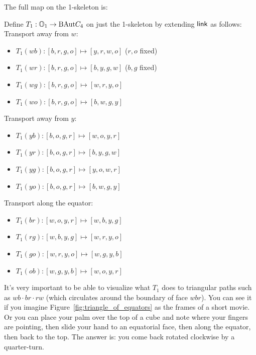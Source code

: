 The full map on the 1-skeleton is:
\begin{mydef}
Define \( T_1:\mathbb{O}_1\to\mathrm{BAut} C_4 \) on just the 1-skeleton by extending \( \mathsf{link} \) as follows:
Transport away from \( w \):
\begin{itemize}
\item \( T_1(wb):[b, r, g, o]\mapsto [y, r, w, o] \) (\( r, o \) fixed)
\item \( T_1(wr):[b, r, g, o]\mapsto [b, y, g, w] \) (\( b, g \) fixed)
\item \( T_1(wg):[b, r, g, o]\mapsto [w, r, y, o] \)
\item \( T_1(wo):[b, r, g, o]\mapsto [b, w, g, y] \)
\end{itemize}
Transport away from \( y \):
\begin{itemize}
\item \( T_1(yb):[b, o, g, r]\mapsto [w, o, y, r] \)
\item \( T_1(yr):[b, o, g, r]\mapsto [b, y, g, w] \)
\item \( T_1(yg):[b, o, g, r]\mapsto [y, o, w, r] \)
\item \( T_1(yo):[b, o, g, r]\mapsto [b, w, g, y] \)
\end{itemize}
Transport along the equator:
\begin{itemize}
\item \( T_1(br):[w, o, y, r]\mapsto [w, b, y, g] \) 
\item \( T_1(rg):[w, b, y, g]\mapsto [w, r, y, o] \)
\item \( T_1(go):[w, r, y, o]\mapsto [w, g, y, b] \)
\item \( T_1(ob):[w, g, y, b]\mapsto [w, o, y, r] \)
\end{itemize}
\end{mydef}

It's very important to be able to visualize what \( T_1 \) does to triangular paths such as \( wb\cdot br\cdot rw \) (which circulates around the boundary of face \( wbr \)). You can see it if you imagine Figure~\ref{fig:triangle_of_equators} as the frames of a short movie. Or you can place your palm over the top of a cube and note where your fingers are pointing, then slide your hand to an equatorial face, then along the equator, then back to the top. The answer is: you come back rotated clockwise by a quarter-turn. 

